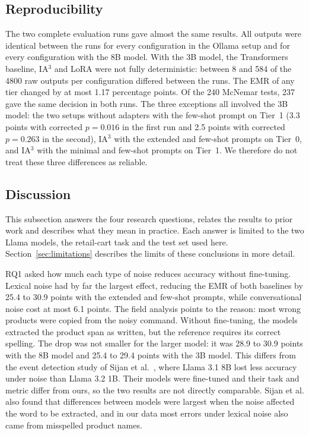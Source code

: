 \documentclass[journal,article,submit,pdftex,moreauthors]{Definitions/mdpi}
\begin{document}
\subsection{Reproducibility}\label{sec:res-repro}

The two complete evaluation runs gave almost the same results. All outputs were identical between the runs for every configuration in the Ollama setup and for every configuration with the 8B model. With the 3B model, the Transformers baseline, IA$^3$ and LoRA were not fully deterministic: between 8 and 584 of the 4800 raw outputs per configuration differed between the runs. The EMR of any tier changed by at most 1.17 percentage points. Of the 240 McNemar tests, 237 gave the same decision in both runs. The three exceptions all involved the 3B model: the two setups without adapters with the few-shot prompt on Tier~1 (3.3 points with corrected $p = 0.016$ in the first run and 2.5 points with corrected $p = 0.263$ in the second), IA$^3$ with the extended and few-shot prompts on Tier~0, and IA$^3$ with the minimal and few-shot prompts on Tier~1. We therefore do not treat these three differences as reliable.

\subsection{Discussion}\label{sec:discussion}

This subsection answers the four research questions, relates the results to prior work and describes what they mean in practice. Each answer is limited to the two Llama models, the retail-cart task and the test set used here. Section~\ref{sec:limitations} describes the limits of these conclusions in more detail.

RQ1 asked how much each type of noise reduces accuracy without fine-tuning. Lexical noise had by far the largest effect, reducing the EMR of both baselines by 25.4 to 30.9 points with the extended and few-shot prompts, while conversational noise cost at most 6.1 points. The field analysis points to the reason: most wrong products were copied from the noisy command. Without fine-tuning, the models extracted the product span as written, but the reference requires its correct spelling. The drop was not smaller for the larger model: it was 28.9 to 30.9 points with the 8B model and 25.4 to 29.4 points with the 3B model. This differs from the event detection study of Sijan et al.~\citep{sijan2026beyond}, where Llama 3.1 8B lost less accuracy under noise than Llama 3.2 1B. Their models were fine-tuned and their task and metric differ from ours, so the two results are not directly comparable. Sijan et al. also found that differences between models were largest when the noise affected the word to be extracted, and in our data most errors under lexical noise also came from misspelled product names.
\end{document}

